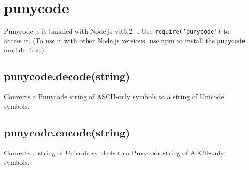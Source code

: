 \section{punycode}

\begin{Shaded}
\begin{Highlighting}[]
\NormalTok{: } 
\end{Highlighting}
\end{Shaded}

\href{http://mths.be/punycode}{Punycode.js} is bundled with Node.js
v0.6.2+. Use \texttt{require('punycode')} to access it. (To use it with
other Node.js versions, use npm to install the \texttt{punycode} module
first.)

\subsection{punycode.decode(string)}

Converts a Punycode string of ASCII-only symbols to a string of Unicode
symbols.

\begin{Shaded}
\begin{Highlighting}[]
\NormalTok{(}\NormalTok{); }
\NormalTok{(}\NormalTok{); }
\end{Highlighting}
\end{Shaded}

\subsection{punycode.encode(string)}

Converts a string of Unicode symbols to a Punycode string of ASCII-only
symbols.

\begin{Shaded}
\begin{Highlighting}[]
\NormalTok{(}\NormalTok{); }
\NormalTok{(}\NormalTok{); }
\end{Highlighting}
\end{Shaded}

